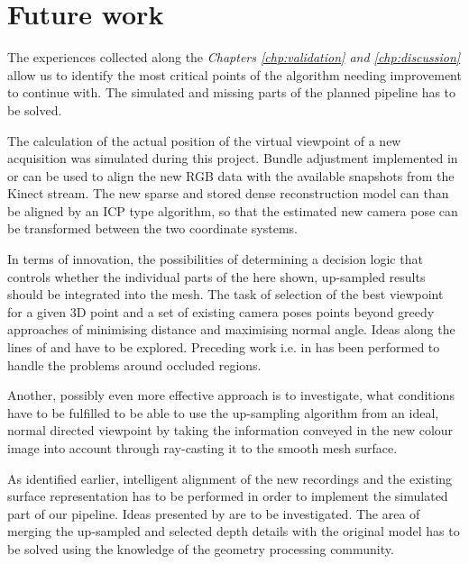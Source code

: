 \documentclass{ucl_thesis}
\begin{document}
\section{Future work}
\label{sec:future_work}

\par The experiences collected along the {\it Chapters \ref{chp:validation} and \ref{chp:discussion}} allow us to identify the most critical points of the algorithm needing improvement to continue with. The simulated and missing parts of the planned pipeline has to be solved. 

\par The calculation of the actual position of the virtual viewpoint of a new acquisition was simulated during this project. Bundle adjustment implemented in \citep{SnavelySS06} or \citep{vsfm} can be used to align the new RGB data with the available snapshots from the Kinect stream. The new sparse and stored dense reconstruction model can than be aligned by an ICP type algorithm, so that the estimated new camera pose can be transformed between the two coordinate systems.

\par In terms of innovation, the possibilities of determining a decision logic that controls whether the individual parts of the here shown, up-sampled results should be integrated into the mesh. The task of selection of the best viewpoint for a given 3D point and a set of existing camera poses points beyond greedy approaches of minimising distance and maximising normal angle. Ideas along the lines of \citep{Buehler:2001} and \citep{keller13realtime} have to be explored. Preceding work i.e. in \citep{Hoiem:2011} has been performed to handle the problems around occluded regions.
\par Another, possibly even more effective approach is to investigate, what conditions have to be fulfilled to be able to use the up-sampling algorithm from an ideal, normal directed viewpoint by taking the information conveyed in the new colour image into account through ray-casting it to the smooth mesh surface.

\par As identified earlier, intelligent alignment of the new recordings and the existing surface representation has to be performed in order to implement the simulated part of our pipeline. Ideas presented by \citep{Herrera:LearnedJointMRF} are to be investigated. The area of merging the up-sampled and selected depth details with the original model has to be solved using the knowledge of the geometry processing community.
\end{document}
